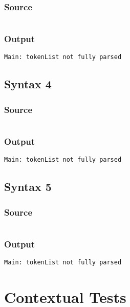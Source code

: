 \documentclass[twoside]{report}
\begin{document}
\subsection{Source}
\inputminted[tabsize=4,linenos,firstnumber=1]{text}{../../src/haskell/PP-project-2016/test/syntax3.shl}
\subsection{Output}
\begin{verbatim}
Main: tokenList not fully parsed
\end{verbatim}

\section{Syntax 4}
\subsection{Source}
\inputminted[tabsize=4,linenos,firstnumber=1]{text}{../../src/haskell/PP-project-2016/test/syntax4.shl}
\subsection{Output}
\begin{verbatim}
Main: tokenList not fully parsed
\end{verbatim}

\section{Syntax 5}
\subsection{Source}
\inputminted[tabsize=4,linenos,firstnumber=1]{text}{../../src/haskell/PP-project-2016/test/syntax5.shl}
\subsection{Output}
\begin{verbatim}
Main: tokenList not fully parsed
\end{verbatim}


\chapter{Contextual Tests}
\end{document}
